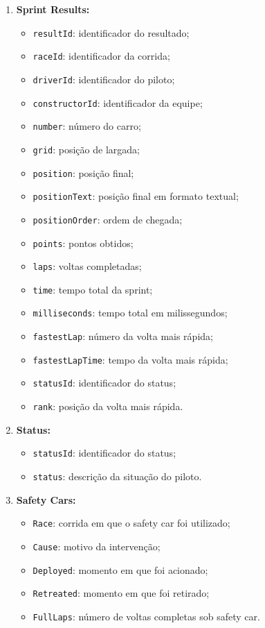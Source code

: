 \documentclass[12pt]{article}
\begin{document}
\begin{enumerate}
    \item \textbf{Sprint Results:}
    \begin{itemize}
        \item \texttt{resultId}: identificador do resultado;
        \item \texttt{raceId}: identificador da corrida;
        \item \texttt{driverId}: identificador do piloto;
        \item \texttt{constructorId}: identificador da equipe;
        \item \texttt{number}: número do carro;
        \item \texttt{grid}: posição de largada;
        \item \texttt{position}: posição final;
        \item \texttt{positionText}: posição final em formato textual;
        \item \texttt{positionOrder}: ordem de chegada;
        \item \texttt{points}: pontos obtidos;
        \item \texttt{laps}: voltas completadas;
        \item \texttt{time}: tempo total da sprint;
        \item \texttt{milliseconds}: tempo total em milissegundos;
        \item \texttt{fastestLap}: número da volta mais rápida;
        \item \texttt{fastestLapTime}: tempo da volta mais rápida;
        \item \texttt{statusId}: identificador do status;
        \item \texttt{rank}: posição da volta mais rápida.
    \end{itemize}

    \item \textbf{Status:}
    \begin{itemize}
        \item \texttt{statusId}: identificador do status;
        \item \texttt{status}: descrição da situação do piloto.
    \end{itemize}

        \item \textbf{Safety Cars:}
    \begin{itemize}
        \item \texttt{Race}: corrida em que o safety car foi utilizado;
        \item \texttt{Cause}: motivo da intervenção;
        \item \texttt{Deployed}: momento em que foi acionado;
        \item \texttt{Retreated}: momento em que foi retirado;
        \item \texttt{FullLaps}: número de voltas completas sob safety car.
    \end{itemize}


\end{enumerate}
\end{document}

